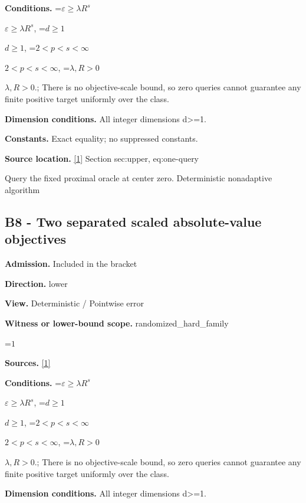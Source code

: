 \documentclass[10pt,a4paper]{article}
\newcommand{\AtlasMath}[1]{\par\begingroup\centering\setbox0=\hbox{$\displaystyle #1$}\ifdim\wd0>1.4\linewidth\typeout{ATLAS WIDE FORMULA: \the\wd0}\fi\ifdim\wd0>\linewidth\resizebox{\linewidth}{!}{\box0}\else\box0\fi\par\endgroup}
\newcommand{\AtlasInlineMath}[1]{\begingroup\setbox0=\hbox{$#1$}\ifdim\wd0>.4\linewidth\endgroup\AtlasMath{#1}\else\endgroup$#1$\fi}
\begin{document}
\textbf{Conditions.} \AtlasInlineMath{\varepsilon\ge\lambda R^s}, \AtlasInlineMath{d\ge1}, \AtlasInlineMath{2<p<s<\infty}, \AtlasInlineMath{\lambda,R>0}.; There is no objective-scale bound, so zero queries cannot guarantee any finite positive target uniformly over the class.



\textbf{Dimension conditions.} All integer dimensions d>=1.



\textbf{Constants.} Exact equality; no suppressed constants.



\textbf{Source location.} \href{https://github.com/WU-Wendao/Colombo/blob/main/colombo_sensorium/Complexity_altas/data/sources/colombo/B2/manuscript.pdf}{[1]} Section sec:upper, eq:one-query



Query the fixed proximal oracle at center zero. Deterministic nonadaptive algorithm



\subsection{B8 - Two separated scaled absolute-value objectives}


\textbf{Admission.} Included in the bracket



\textbf{Direction.} lower



\textbf{View.} Deterministic / Pointwise error



\textbf{Witness or lower-bound scope.} randomized\_hard\_family



\AtlasMath{1}


\textbf{Sources.} \href{https://github.com/WU-Wendao/Colombo/blob/main/colombo_sensorium/Complexity_altas/data/sources/colombo/B2/manuscript.pdf}{[1]}



\textbf{Conditions.} \AtlasInlineMath{\varepsilon\ge\lambda R^s}, \AtlasInlineMath{d\ge1}, \AtlasInlineMath{2<p<s<\infty}, \AtlasInlineMath{\lambda,R>0}.; There is no objective-scale bound, so zero queries cannot guarantee any finite positive target uniformly over the class.



\textbf{Dimension conditions.} All integer dimensions d>=1.
\end{document}
